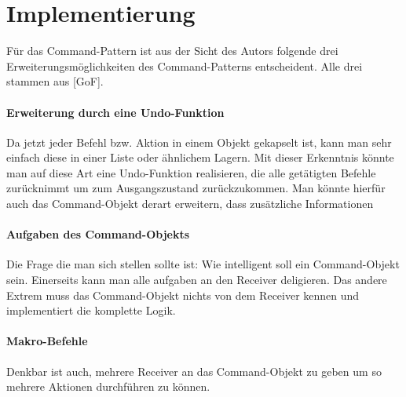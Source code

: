 \section{Implementierung}
Für das Command-Pattern ist aus der Sicht des Autors folgende drei Erweiterungsmöglichkeiten des Command-Patterns entscheident. Alle drei stammen aus [GoF]. 

\paragraph{Erweiterung durch eine Undo-Funktion} Da jetzt jeder Befehl bzw. Aktion in einem Objekt gekapselt ist, kann man sehr einfach diese in einer Liste oder ähnlichem Lagern. Mit dieser Erkenntnis könnte man auf diese Art eine Undo-Funktion realisieren, die alle getätigten Befehle zurücknimmt um zum Ausgangszustand zurückzukommen. Man könnte hierfür auch das Command-Objekt derart erweitern, dass zusätzliche Informationen

\paragraph{Aufgaben des Command-Objekts} Die Frage die man sich stellen sollte ist: Wie intelligent soll ein Command-Objekt sein. Einerseits kann man alle aufgaben an den Receiver deligieren. Das andere Extrem muss das Command-Objekt nichts von dem Receiver kennen und implementiert die komplette Logik.

\paragraph{Makro-Befehle} Denkbar ist auch, mehrere Receiver an das Command-Objekt zu geben um so mehrere Aktionen durchführen zu können.


